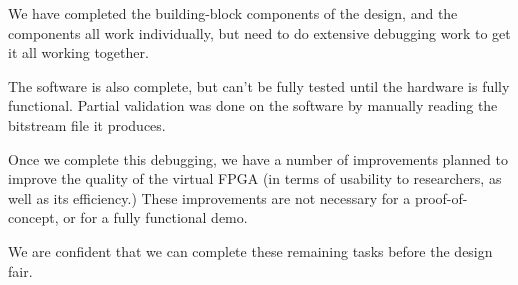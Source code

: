 We have completed the building-block components of the design, and the components all work individually, but need to do extensive debugging work to get it all working together.

The software is also complete, but can't be fully tested until the hardware is fully functional.
Partial validation was done on the software by manually reading the bitstream file it produces.

Once we complete this debugging, we have a number of improvements planned to improve the quality of the virtual FPGA (in terms of usability to researchers, as well as its efficiency.)
These improvements are not necessary for a proof-of-concept, or for a fully functional demo.

We are confident that we can complete these remaining tasks before the design fair.



